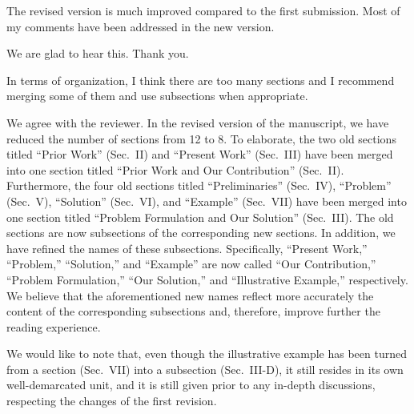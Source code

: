 \begin{reviewer}
The revised version is much improved compared to the first submission. Most of
my comments have been addressed in the new version.
\end{reviewer}

\begin{authors}
We are glad to hear this. Thank you.
\end{authors}

\begin{reviewer}
In terms of organization, I think there are too many sections and I recommend
merging some of them and use subsections when appropriate.
\end{reviewer}

\begin{authors}
We agree with the reviewer. In the revised version of the manuscript, we have
reduced the number of sections from 12 to 8. To elaborate, the two old sections
titled ``Prior Work'' (Sec.~II) and ``Present Work'' (Sec.~III) have been merged
into one section titled ``Prior Work and Our Contribution'' (Sec.~II).
Furthermore, the four old sections titled ``Preliminaries'' (Sec.~IV),
``Problem'' (Sec.~V), ``Solution'' (Sec.~VI), and ``Example'' (Sec.~VII) have
been merged into one section titled ``Problem Formulation and Our Solution''
(Sec.~III). The old sections are now subsections of the corresponding new
sections. In addition, we have refined the names of these subsections.
Specifically, ``Present Work,'' ``Problem,'' ``Solution,'' and ``Example'' are
now called ``Our Contribution,'' ``Problem Formulation,'' ``Our Solution,'' and
``Illustrative Example,'' respectively. We believe that the aforementioned new
names reflect more accurately the content of the corresponding subsections and,
therefore, improve further the reading experience.

We would like to note that, even though the illustrative example has been turned
from a section (Sec.~VII) into a subsection (Sec.~III-D), it still resides in
its own well-demarcated unit, and it is still given prior to any in-depth
discussions, respecting the changes of the first revision.

\begin{actions}

\end{actions}
\end{authors}


